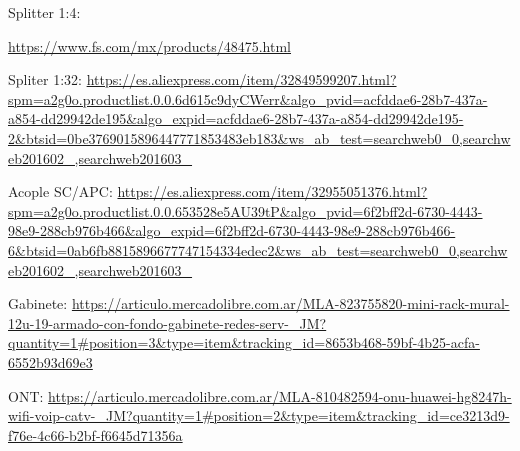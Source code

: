 \begin{thebibliography}{99}
Splitter 1:4: \begin{tiny}
\url{https://www.fs.com/mx/products/48475.html}
\end{tiny}

 Spliter 1:32: {\tiny \url{https://es.aliexpress.com/item/32849599207.html?spm=a2g0o.productlist.0.0.6d615c9dyCWerr&algo_pvid=acfddae6-28b7-437a-a854-dd29942de195&algo_expid=acfddae6-28b7-437a-a854-dd29942de195-2&btsid=0be3769015896447771853483eb183&ws_ab_test=searchweb0_0,searchweb201602_,searchweb201603_}}

 Acople SC/APC: {\tiny \url{https://es.aliexpress.com/item/32955051376.html?spm=a2g0o.productlist.0.0.653528e5AU39tP&algo_pvid=6f2bff2d-6730-4443-98e9-288cb976b466&algo_expid=6f2bff2d-6730-4443-98e9-288cb976b466-6&btsid=0ab6fb8815896677747154334edec2&ws_ab_test=searchweb0_0,searchweb201602_,searchweb201603_}}


 Gabinete: {\tiny \url{https://articulo.mercadolibre.com.ar/MLA-823755820-mini-rack-mural-12u-19-armado-con-fondo-gabinete-redes-serv-_JM?quantity=1#position=3&type=item&tracking_id=8653b468-59bf-4b25-acfa-6552b93d69e3}}


 ONT: {\tiny \url{https://articulo.mercadolibre.com.ar/MLA-810482594-onu-huawei-hg8247h-wifi-voip-catv-_JM?quantity=1#position=2&type=item&tracking_id=ce3213d9-f76e-4c66-b2bf-f6645d71356a}}








\end{thebibliography}
